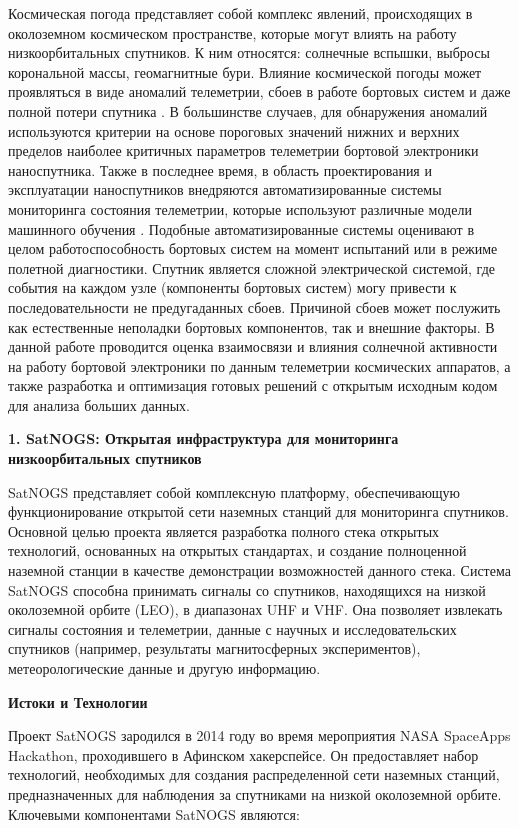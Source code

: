 ﻿\documentclass[14pt, a4paper]{extreport}
\begin{document}
Космическая погода представляет собой комплекс явлений, происходящих
в околоземном космическом пространстве, которые могут влиять на работу
низкоорбитальных спутников. К ним относятся: солнечные вспышки, выбросы
корональной массы, геомагнитные бури. Влияние космической погоды может
проявляться в виде аномалий телеметрии, сбоев в работе бортовых систем
и даже полной потери спутника \cite{green2017impact}. В большинстве случаев, для обнаружения
аномалий используются критерии на основе пороговых значений нижних и верхних
пределов наиболее критичных параметров телеметрии бортовой электроники
наноспутника. Также в последнее время, в область проектирования и
эксплуатации наноспутников внедряются автоматизированные системы мониторинга
состояния телеметрии, которые используют различные модели машинного обучения \cite{schlag2018numerical}.
Подобные автоматизированные системы оценивают в целом работоспособность бортовых
систем на момент испытаний или в режиме полетной диагностики. Спутник является
сложной электрической системой, где события на каждом узле (компоненты бортовых
систем) могу привести к последовательности не предугаданных сбоев. Причиной сбоев
может послужить как естественные неполадки бортовых компонентов, так и внешние
факторы.  В данной работе проводится оценка взаимосвязи и влияния солнечной
активности на работу бортовой электроники по данным телеметрии космических
аппаратов, а также разработка и оптимизация готовых решений с открытым исходным
кодом для анализа больших данных.

\newpage

{\Large \textbf {1. SatNOGS: Открытая инфраструктура для мониторинга низкоорбитальных спутников}}

SatNOGS представляет собой комплексную платформу, обеспечивающую функционирование открытой сети наземных станций для мониторинга спутников. Основной целью проекта является разработка полного стека открытых технологий, основанных на открытых стандартах, и создание полноценной наземной станции в качестве демонстрации возможностей данного стека. Система SatNOGS способна принимать сигналы со спутников, находящихся на низкой околоземной орбите (LEO), в диапазонах UHF и VHF. Она позволяет извлекать сигналы состояния и телеметрии, данные с научных и исследовательских спутников (например, результаты магнитосферных экспериментов), метеорологические данные и другую информацию.

\textbf{Истоки и Технологии}

Проект SatNOGS зародился в 2014 году во время мероприятия NASA SpaceApps Hackathon, проходившего в Афинском хакерспейсе. Он предоставляет набор технологий, необходимых для создания распределенной сети наземных станций, предназначенных для наблюдения за спутниками на низкой околоземной орбите.
Ключевыми компонентами SatNOGS являются:
\end{document}
